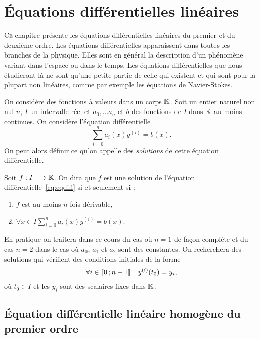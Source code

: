 \chapter{Équations différentielles linéaires}
\label{chap:equadiff}
\minitoc
\minilof
\minilot

\lettrine{C}e chapitre présente les équations différentielles linéaires du premier et du deuxième ordre. Les équations différentielles apparaissent dans toutes les branches de la physique. Elles sont en général la description d'un phénomène variant dans l'espace ou dans le temps. Les équations différentielles que nous étudieront là ne sont qu'une petite partie de celle qui existent et qui sont pour la plupart non linéaires, comme par exemple les équations de Navier-Stokes.

On considère des fonctions à valeurs dans un corps $\mathbb{K}$. Soit un entier naturel non nul $n$, $I$ un intervalle réel et $a_0, \ldots a_n$ et $b$ des fonctions de $I$ dans $\mathbb{K}$ au moins continues. On considère l'équation différentielle
\begin{equation}
\sum_{i=0}^n a_i(x) y^{(i)} = b(x) \label{eq:eqdiff}.
\end{equation}
On peut alors définir ce qu'on appelle des \emph{solutions} de cette équation différentielle.
\begin{defdef}
Soit $f : I \longrightarrow \mathbb{K}$. On dira que $f$ est une solution de l'équation différentielle~\eqref{eq:eqdiff} si et seulement si :
\begin{enumerate}
\item $f$ est au moins $n$ fois dérivable,
\item $\forall x \in I \sum_{i=0}^n a_i(x) y^{(i)} = b(x)$.
\end{enumerate}
\end{defdef}
En pratique on traitera dans ce cours du cas où $n=1$ de façon complète et du cas $n=2$ dans le cas où $a_0$, $a_1$ et $a_2$ sont des constantes. On recherchera des solutions qui vérifient des conditions initiales de la forme 
\begin{equation}
 \forall i \in \mathopen{\llbracket}0\mathclose{}\mathpunct{};n-1\mathclose{\rrbracket} \quad y^{(i)}(t_0)=y_i,
\end{equation}
où $t_0 \in I$  et les $y_i$ sont des scalaires fixes dans $\mathbb{K}$.
\section{Équation différentielle linéaire homogène du premier ordre}
\label{sec:equadifflinhomog1}
